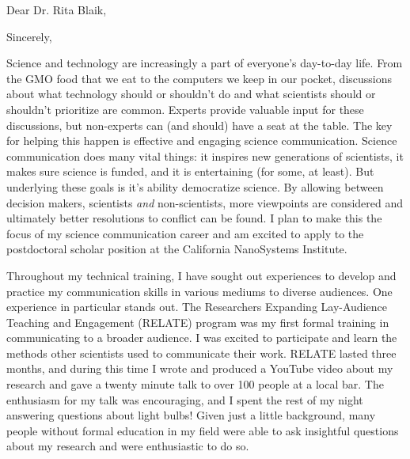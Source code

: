 \thispagestyle{empty}


\date{December 10, 2018}
\opening{Dear Dr. Rita Blaik,}
\closing{Sincerely,}
\makelettertitle

Science and technology are increasingly a part of everyone's day-to-day life. From the GMO food that we eat to the computers we keep in our pocket, discussions about what technology should or shouldn't do and what scientists should or shouldn't prioritize are common. Experts provide valuable input for these discussions, but non-experts can (and should) have a seat at the table. The key for helping this happen is effective and engaging science communication. Science communication does many vital things: it inspires new generations of scientists, it makes sure science is funded, and it is entertaining (for some, at least). But underlying these goals is it's ability democratize science. By allowing between decision makers, scientists \textit{and} non-scientists, more viewpoints are considered and ultimately better resolutions to conflict can be found. I plan to make this the focus of my science communication career and am excited to apply to the postdoctoral scholar position at the California NanoSystems Institute. 

Throughout my technical training, I have sought out experiences to develop and practice my communication skills in various mediums to diverse audiences. One experience in particular stands out. The Researchers Expanding Lay-Audience Teaching and Engagement (RELATE) program was my first formal training in communicating to a broader audience. I was excited to participate and learn the methods other scientists used to communicate their work. RELATE lasted three months, and during this time I wrote and produced a YouTube video about my research and gave a twenty minute talk to over 100 people at a local bar. The enthusiasm for my talk was encouraging, and I spent the rest of my night answering questions about light bulbs! Given just a little background, many people without formal education in my field were able to ask insightful questions about my research and were enthusiastic to do so. 

